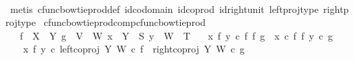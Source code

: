 \begin{isabellebody}
%
\isadelimproof
\ \ %
\endisadelimproof
%
\isatagproof
{}\isamarkupfalse%
\ {\isacharparenleft}{\kern0pt}metis\ cfunc{\isacharunderscore}{\kern0pt}bowtie{\isacharunderscore}{\kern0pt}prod{\isacharunderscore}{\kern0pt}def\ id{\isacharunderscore}{\kern0pt}codomain\ id{\isacharunderscore}{\kern0pt}coprod\ id{\isacharunderscore}{\kern0pt}right{\isacharunderscore}{\kern0pt}unit{}\ left{\isacharunderscore}{\kern0pt}proj{\isacharunderscore}{\kern0pt}type\ right{\isacharunderscore}{\kern0pt}proj{\isacharunderscore}{\kern0pt}type{\isacharparenright}{\kern0pt}%
\endisatagproof
{\isafoldproof}%
%
\isadelimproof
\isanewline
%
\endisadelimproof
\isanewline
{}\isamarkupfalse%
\ cfunc{\isacharunderscore}{\kern0pt}bowtie{\isacharunderscore}{\kern0pt}prod{\isacharunderscore}{\kern0pt}comp{\isacharunderscore}{\kern0pt}cfunc{\isacharunderscore}{\kern0pt}bowtie{\isacharunderscore}{\kern0pt}prod{\isacharcolon}{\kern0pt}\isanewline
\ \ \ {\isachardoublequoteopen}f\ {\isacharcolon}{\kern0pt}\ X\ {\isasymrightarrow}\ Y{\isachardoublequoteclose}\ {\isachardoublequoteopen}g\ {\isacharcolon}{\kern0pt}\ V\ {\isasymrightarrow}\ W{\isachardoublequoteclose}\ {\isachardoublequoteopen}x\ {\isacharcolon}{\kern0pt}\ Y\ {\isasymrightarrow}\ S{\isachardoublequoteclose}\ {\isachardoublequoteopen}y\ {\isacharcolon}{\kern0pt}\ W\ {\isasymrightarrow}\ T{\isachardoublequoteclose}\isanewline
\ \ \ {\isachardoublequoteopen}{\isacharparenleft}{\kern0pt}x\ {\isasymbowtie}\isactrlsub f\ y{\isacharparenright}{\kern0pt}\ {\isasymcirc}\isactrlsub c\ {\isacharparenleft}{\kern0pt}f\ {\isasymbowtie}\isactrlsub f\ g{\isacharparenright}{\kern0pt}\ {\isacharequal}{\kern0pt}\ {\isacharparenleft}{\kern0pt}x\ {\isasymcirc}\isactrlsub c\ f{\isacharparenright}{\kern0pt}\ {\isasymbowtie}\isactrlsub f\ {\isacharparenleft}{\kern0pt}y\ {\isasymcirc}\isactrlsub c\ g{\isacharparenright}{\kern0pt}{\isachardoublequoteclose}\isanewline
%
\isadelimproof
%
\endisadelimproof
%
\isatagproof
{}\isamarkupfalse%
{\isacharminus}{\kern0pt}\ \isanewline
\ \ \isamarkupfalse%
\ {\isachardoublequoteopen}{\isacharparenleft}{\kern0pt}x\ {\isasymbowtie}\isactrlsub f\ y{\isacharparenright}{\kern0pt}\ {\isasymcirc}\isactrlsub c\ {\isacharparenleft}{\kern0pt}{\isacharparenleft}{\kern0pt}left{\isacharunderscore}{\kern0pt}coproj\ Y\ W\ {\isasymcirc}\isactrlsub c\ f{\isacharparenright}{\kern0pt}\ {\isasymamalg}\ {\isacharparenleft}{\kern0pt}right{\isacharunderscore}{\kern0pt}coproj\ Y\ W\ {\isasymcirc}\isactrlsub c\ g{\isacharparenright}{\kern0pt}{\isacharparenright}{\kern0pt}\isanewline

\end{isabellebody}
